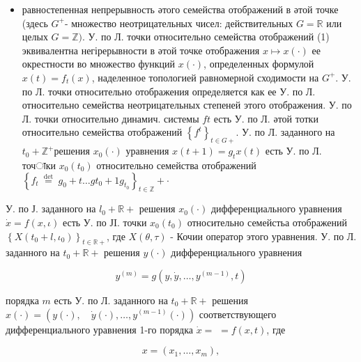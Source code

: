 \documentclass[10pt]{article}
\begin{document}
\begin{itemize}

  \item равностепенная непрерывность әтого семейства отображений в әтой точке (здесь $G^{+}$- множество неотрицательных чисел: действительных $G=\mathbb{R}$ или целых $G=\mathbb{Z})$. У. по Л. точки относительно семейства отображений (1) эквивалентна негірерывности в әтой точке отображения $x \longmapsto x(\cdot)$ ее окрестности во множество функций $x(\cdot)$, определенных формулой $x(t)=f_{t}(x)$, наделенное топологией равномерной сходимости на $G^{+}$. У. по Л. точки относительно отображения определяется как ее У. по Л. относительно семейства неотрицательных степеней этого отображения. У. по Л. точки относительно динамич. системы $f t$ есть У. по Л. әтой тотки относительно семейства отображений $\left\{f^{t}\right\}_{t \in G+}$. $\mathrm{У}$. по Л. заданного на $t_{0}+\mathbb{Z}^{+}$решения $x_{0}(\cdot)$ уравнения $x(t+1)=g_{t} x(t)$ есть У. по Л. точाки $x_{0}\left(t_{0}\right)$ относительно семейства отображений $\left\{f_{t} \stackrel{\text { det }}{=} g_{0}+t \ldots g t_{0}+1 g_{t_{0}}\right\}_{t \in \mathbb{Z}}+\cdot$

\end{itemize}



У. по Ј. заданного на $l_{0}+\mathbb{R}+$ решения $x_{0}(\cdot)$ дифференциального уравнения $\dot{x}=f(x, \iota)$ есть У. по ЈI. точки $x_{0}\left(t_{0}\right)$ относительно семейстьа отображений $\left\{X\left(t_{0}+l, \iota_{0}\right)\right\}_{t \in \mathbb{R}+}$, где $X(\theta, \tau)$ - Кочии оператор этого уравнения. У. по Л. заданного на $t_{0}+\mathbb{R}+$ решения $y(\cdot)$ дифференциального уравнения



\[

y^{(m)}=g\left(y, \dot{y}, \ldots, y^{(m-1)}, t\right)

\]



порядка $m$ есть У. по Л. заданного на $t_{0}+\mathbb{R}+$ решения $x(\cdot)=\left(y(\cdot), \quad \dot{y}(\cdot), \ldots, y^{(m-1)}(\cdot)\right)$ соответствующего дифференциального уравнения 1-го порядка $\dot{x}=$ $=f(x, t)$, где



\[

x=\left(x_{1}, \ldots, x_{m}\right),

\]
\end{document}
